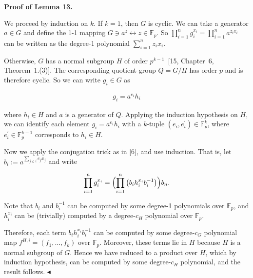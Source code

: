 \documentclass[10pt,a4paper]{article}
\begin{document}



\par\medskip\noindent\textbf{Proof of Lemma 13.}\par




We proceed by induction on $k$.
If $k=1$, then $G$ is cyclic.
We can take a generator $a\in G$ and define the 1-1 mapping $G\ni a^{z}\leftrightarrow z\in\mathbb{F}_{p}$.
So $\prod_{i=1}^{n}g_{i}^{x_{i}}=\prod_{i=1}^{n}a^{z_{i}x_{i}}$ can be written as the degree-1 polynomial $\sum_{i=1}^{n}z_{i}x_{i}$.\par




Otherwise, $G$ has a normal subgroup $H$ of order
$p^{k-1}$ [15, Chapter 6, Theorem 1.(3)]. The corresponding
quotient group $Q=G/H$ has order $p$ and is therefore cyclic.
So we can write $g_{i}\in G$ as\par


\[\begin{gathered}
g_{i}=a^{e_{i}}h_{i}
\end{gathered}\]


where $h_{i}\in H$ and $a$ is a generator of $Q$.
Applying the induction hypothesis on $H$, we can identify each element $g_{i}=a^{e_{i}}h_{i}$ with a $k$-tuple $(e_{i},e_{i}^{\prime})\in\mathbb{F}_{p}^{k}$, where $e_{i}^{\prime}\in\mathbb{F}_{p}^{k-1}$ corresponds to $h_{i}\in H$.\par




Now we apply the conjugation trick as in [6], and use induction. That is, let $b_{i}:=a^{\sum_{j\leq i}e_{j}x_{j}}$ and write\par


\[\begin{gathered}
\prod_{i=1}^{n}g_{i}^{x_{i}}=\Bigl{(}\prod_{i=1}^{n}\left(b_{i}h_{i}^{x_{i}}b_{i}^{-1}\right)\Bigr{)}b_{n}.
\end{gathered}\]


Note that $b_{i}$ and $b_{i}^{-1}$ can be computed by some degree-1 polynomials over $\mathbb{F}_{p}$, and $h_{i}^{x_{i}}$ can be (trivially) computed by a degree-$c_{H}$ polynomial over $\mathbb{F}_{p}$.\par




Therefore, each term $b_{i}h_{i}^{x_{i}}b_{i}^{-1}$ can be computed by some degree-$c_{G}$ polynomial map $f^{H,i}=(f_{1},\ldots,f_{k})$ over $\mathbb{F}_{p}$.
Moreover, these terms lie in $H$ because $H$ is a normal subgroup of $G$. Hence we have reduced to a product over
$H$, which by induction hypothesis, can be computed by some degree-$c_{H}$ polynomial, and the result follows.
$\blacktriangleleft$\par
\end{document}
